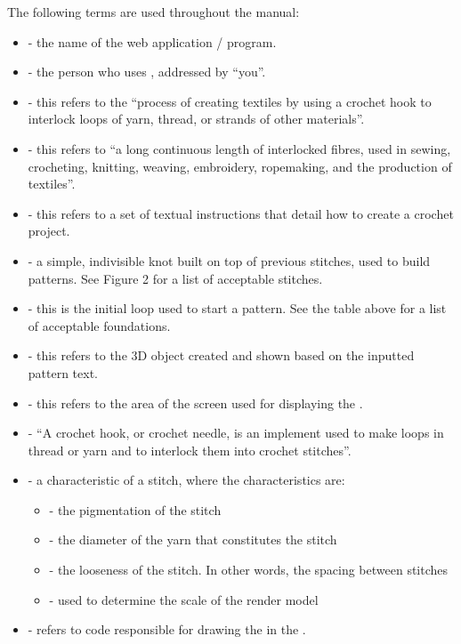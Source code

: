 \documentclass[main.tex]{subfiles}
\begin{document}
The following terms are used throughout the manual:

\begin{itemize}
\item \CC* - the name of the web application / program.
\item {} - the person who uses \CC, addressed by ``you''. 
\item {} - this refers to the ``process of creating textiles by using a crochet hook to interlock loops of yarn, thread, or strands of other materials''.
\item {} - this refers to ``a long continuous length of interlocked fibres, used in sewing, crocheting, knitting, weaving, embroidery, ropemaking, and the production of textiles''.
\item {} - this refers to a set of textual instructions that detail how to create a crochet project. 
\item {} - a simple, indivisible knot built on top of previous stitches, used to build patterns. See Figure 2 for a list of acceptable stitches.
\item {} - this is the initial loop used to start a pattern. See the table above for a list of acceptable foundations.
\item \RM* - this refers to the 3D object created and shown based on the inputted pattern text.
\item \CRW* - this refers to the area of the screen used for displaying the \RM.
\item {} - ``A crochet hook, or crochet needle, is an implement used to make loops in thread or yarn and to interlock them into crochet stitches''.
\item {} - a characteristic of a stitch, where the characteristics are:
    \begin{itemize}\compact
        \item {} - the pigmentation of the stitch
        \item {} - the diameter of the yarn that constitutes the stitch
        \item {} - the looseness of the stitch. In other words, the spacing between stitches
        \item {} - used to determine the scale of the render model
    \end{itemize}
\item \IR* - refers to \CC{} code responsible for drawing the \RM{} in the \CRW.

\end{itemize}
\end{document}
